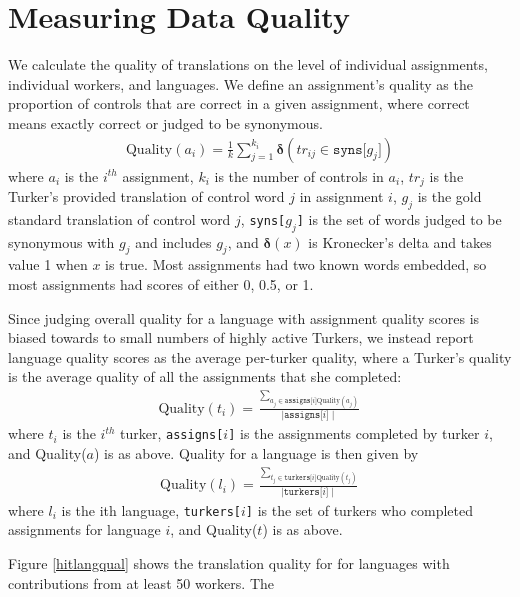 \documentclass[11pt]{article}
\begin{document}
\section{Measuring Data Quality}

We calculate the quality of translations on the level of individual assignments, individual workers, and languages.  We define an assignment's quality as the proportion of controls that are correct in a given assignment, where correct means exactly correct or judged to be synonymous.
\begin{align}	
	\text{Quality}(a_i) = \frac{1}{k}\sum\limits_{j=1}^{k_i}\mathbf{\delta}(tr_{ij} \in \texttt{syns[$g_j$]})
\end{align}	
where $a_i$ is the $i^{th}$ assignment, $k_i$ is the number of controls in $a_i$, $tr_j$ is the Turker's provided translation of control word $j$ in assignment $i$, $g_j$ is the gold standard translation of control word $j$, \texttt{syns[$g_j$]} is the set of words judged to be synonymous with $g_j$ and includes $g_j$, and $\mathbf{\delta}(x)$ is Kronecker's delta and takes value 1 when $x$ is true. 
Most assignments had two known words embedded, so most assignments had scores of either 0, 0.5, or 1. 

Since judging overall quality for a language with assignment quality scores is biased towards to small numbers of highly active Turkers, we instead report language quality scores as the average per-turker quality, where a Turker's quality is  the average quality of all the assignments that she completed:
\begin{align}	
	\text{Quality}(t_i) = \frac{\sum_{a_j \in \texttt{assigns[$i$]}\text{Quality}(a_j)}}{\mid \texttt{assigns[$i$]} \mid}
\end{align}	
where $t_i$ is the $i^{th}$ turker, \texttt{assigns[$i$]} is the assignments completed by turker $i$, and Quality($a$) is as above.
%
Quality for a language is then given by
\begin{align}	
	\text{Quality}(l_i) = \frac{\sum_{t_j \in \texttt{turkers[$i$]}\text{Quality}(t_j)}}{\mid \texttt{turkers[$i$]} \mid}
\end{align}	
where $l_i$ is the ith language, \texttt{turkers[$i$]} is the set of turkers who completed assignments for language $i$, and Quality($t$) is as above.


Figure \ref{hitlangqual} shows the translation quality for for languages with contributions from at least 50 workers. The 
\end{document}
